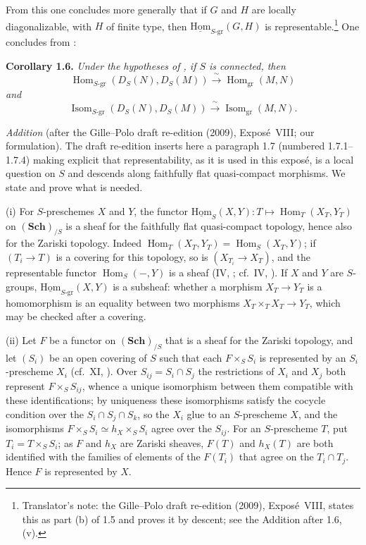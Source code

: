 From this one concludes more generally that if \(G\) and \(H\) are locally
diagonalizable, with \(H\) of finite type, then
\(\operatorname{\underline{Hom}}_{S\text{-}\mathrm{gr}}(G,H)\) is
representable.\footnote{Translator's note: the Gille--Polo draft re-edition (2009), Expos\'e~VIII,
states this as part (b) of 1.5 and proves it by descent; see the Addition after 1.6, (v).} One concludes from :

\medskip
\noindent{}\textbf{Corollary 1.6.}
\textit{Under the hypotheses of , if \(S\) is connected, then}
\[
  \operatorname{Hom}_{S\text{-}\mathrm{gr}}(D_S(N),D_S(M))
  \xrightarrow{\ \sim\ }
  \operatorname{Hom}_{\mathrm{gr}}(M,N)
\]
\textit{and}
\[
  \operatorname{Isom}_{S\text{-}\mathrm{gr}}(D_S(N),D_S(M))
  \xrightarrow{\ \sim\ }
  \operatorname{Isom}_{\mathrm{gr}}(M,N).
\]

\medskip
\noindent{}\emph{Addition} (after the Gille--Polo draft
re-edition (2009), Expos\'e~VIII; our formulation). The draft re-edition inserts here a paragraph 1.7
(numbered 1.7.1--1.7.4) making explicit that representability, as it is used in this exposé, is a
local question on \(S\) and descends along faithfully flat quasi-compact morphisms. We state and prove
what is needed.

(i) For \(S\)-preschemes \(X\) and \(Y\), the functor
\(\operatorname{\underline{Hom}}_S(X,Y)\colon T\mapsto\operatorname{Hom}_T(X_T,Y_T)\) on
\((\mathbf{Sch})_{/S}\) is a sheaf for the faithfully flat quasi-compact topology, hence also for the
Zariski topology. Indeed \(\operatorname{Hom}_T(X_T,Y_T)=\operatorname{Hom}_S(X_T,Y)\); if
\((T_i\to T)\) is a covering for this topology, so is \((X_{T_i}\to X_T)\), and the representable
functor \(\operatorname{Hom}_S(-,Y)\) is a sheaf (IV, ;
cf.\ IV, ).
If \(X\) and \(Y\) are \(S\)-groups, \(\operatorname{\underline{Hom}}_{S\text{-}\mathrm{gr}}(X,Y)\) is a
subsheaf: whether a morphism \(X_T\to Y_T\) is a homomorphism is an equality between two morphisms
\(X_T\times_TX_T\to Y_T\), which may be checked after a covering.

(ii) Let \(F\) be a functor on \((\mathbf{Sch})_{/S}\) that is a sheaf for the Zariski topology, and
let \((S_i)\) be an open covering of \(S\) such that each \(F\times_SS_i\) is represented by an
\(S_i\)-prescheme \(X_i\) (cf.\ XI, ). Over
\(S_{ij}=S_i\cap S_j\) the restrictions of \(X_i\) and \(X_j\) both represent \(F\times_SS_{ij}\),
whence a unique isomorphism between them compatible with these identifications; by uniqueness these
isomorphisms satisfy the cocycle condition over the \(S_i\cap S_j\cap S_k\), so the \(X_i\) glue to an
\(S\)-prescheme \(X\), and the isomorphisms \(F\times_SS_i\simeq h_X\times_SS_i\) agree over the
\(S_{ij}\). For an \(S\)-prescheme \(T\), put \(T_i=T\times_SS_i\); as \(F\) and \(h_X\) are Zariski
sheaves, \(F(T)\) and \(h_X(T)\) are both identified with the families of elements of the \(F(T_i)\)
that agree on the \(T_i\cap T_j\). Hence \(F\) is represented by \(X\).

